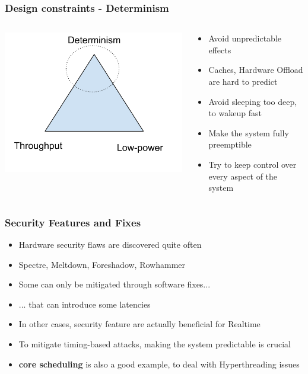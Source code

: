 \begin{frame}
	\frametitle{Design constraints - Determinism}
	\begin{columns}
	\begin{column}{0.35\textwidth}
	\includegraphics[width=\textwidth]{slides/realtime-linux-realtime-systems/triangle_design_determinism.pdf}
	\end{column}
		\begin{column}{0.65\textwidth}
			\begin{itemize}
				\item Avoid unpredictable effects
				\item Caches, Hardware Offload are hard to predict
				\item Avoid sleeping too deep, to wakeup fast
				\item Make the system fully preemptible
				\item Try to keep control over every aspect of the system
			\end{itemize}
		\end{column}
	\end{columns}
\end{frame}

\begin{frame}
	\frametitle{Security Features and Fixes}
	\begin{itemize}
		\item Hardware security flaws are discovered quite often
		\item Spectre, Meltdown, Foreshadow, Rowhammer
		\item Some can only be mitigated through software fixes...
		\item ... that can introduce some latencies
		\item In other cases, security feature are actually beneficial for Realtime
		\item To mitigate timing-based attacks, making the system predictable is crucial
		\item \textbf{core scheduling} is also a good example, to deal with Hyperthreading issues
	\end{itemize}
\end{frame}

